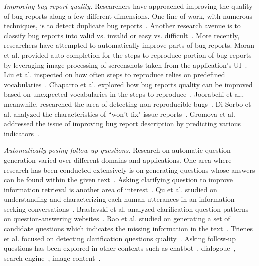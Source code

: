 \noindent
{\em Improving bug report quality.} Researchers have approached improving the quality of bug reports along a few different dimensions. One line of work, with numerous techniques, is to detect duplicate bug reports~\cite{chaparro19reformulating}. Another research avenue is to classify bug reports into valid vs. invalid or easy vs. difficult~\cite{fan20chaff,hooimeijer07modeling}. More recently, researchers have attempted to automatically improve parts of bug reports. Moran et al. provided auto-completion for the steps to reproduce portion of bug reports by leveraging image processing of screenshots taken from the application's UI~\cite{moran15autocompleting}. Liu et al. inspected on how often steps to reproduce relies on predefined vocabularies~\cite{liu2020automated}. Chaparro et al. explored how bug reports quality can be improved based on unexpected vocabularies in the steps to reproduce~\cite{Chaparro2019AssessingTQ}. Joorabchi et al., meanwhile, researched the area of detecting non-reproducible bugs~\cite{erfani2014works}. Di Sorbo et al. analyzed the characteristics of ``won't fix" issue reports~\cite{Sorbo2019WontWF}. Gromova et al. addressed the issue of improving bug report description by predicting various indicators~\cite{gromova2019raising}.

\noindent
{\em Automatically posing follow-up questions.} Research on automatic question generation varied over different domains and applications. One area where research has been conducted extensively is on generating questions whose answers can be found within the given text~\cite{vanderwende2008importance, rus2011question, zhou2017neural, heilman2010good, duan2017question,  du2017learning}. Asking clarifying question to improve information retrieval is another area of interest~\cite{10.1145/3366423.3380126, 10.1145/3331184.3331265, stoyanchev2014towards}.  Qu et al. studied on understanding and characterizing each human utterances in an information-seeking conversations~\cite{10.1145/3209978.3210124}. Braslavski et al. analyzed clarification question patterns on question-answering websites~\cite{10.1145/3020165.3022149}. Rao et al. studied on generating a set of candidate questions which indicates the missing information in the text~\cite{rao-daume-iii-2018-learning}. Trienes et al. focused on detecting clarification questions quality~\cite{trienes2019identifying}. Asking follow-up questions has been explored in other contexts such as chatbot~\cite{Hancock2019LearningFD}, dialogoue~\cite{de2005implementing, de2003analysis}, search engine~\cite{Ren2020ConversationsWS}, image content~\cite{Mostafazadeh_2016}.
